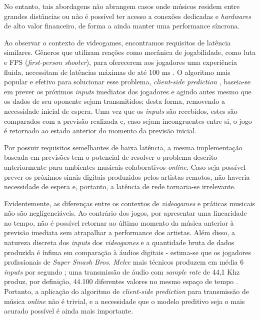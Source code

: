 No entanto, tais abordagens não abrangem casos onde músicos residem entre grandes distâncias ou não é possível ter acesso a conexões dedicadas e \textit{hardwares} de alto valor financeiro, de forma a ainda manter uma performance síncrona.

Ao observar o contexto de videogames, encontramos requisitos de latência similares. Gêneros que utilizam reações como mecânica de jogabilidade, como luta e FPS (\textit{first-person shooter}), para oferecerem aos jogadores uma experiência fluida, necessitam de latências máximas de até 100 ms \cite{pubnub}. O algoritmo mais popular e efetivo para solucionar esse problema, \textit{client-side prediction} \cite{client-side-prediction}, baseia-se em prever os próximos \textit{inputs} imediatos dos jogadores e agindo antes mesmo que os dados de seu oponente sejam transmitidos; desta forma, removendo a necessidade inicial de espera. Uma vez que os \textit{inputs} são recebidos, estes são comparados com a previsão realizada e, caso sejam incongruentes entre si, o jogo é retornado ao estado anterior do momento da previsão inicial.

Por possuir requisitos semelhantes de baixa latência, a mesma implementação baseada em previsões tem o potencial de resolver o problema descrito anteriormente para ambientes musicais colaborativos \textit{online}. Caso seja possível prever os próximos sinais digitais produzidos pelos artistas remotos, não haveria necessidade de espera e, portanto, a latência de rede tornaria-se irrelevante.

Evidentemente, as diferenças entre os contextos de \textit{videogames} e práticas musicais não são negligenciáveis. Ao contrário dos jogos, por apresentar uma linearidade no tempo, não é possível retornar ao último momento da música anterior à previsão imediata sem atrapalhar a performance dos artistas. Além disso, a natureza discreta dos \textit{inputs} dos \textit{videogames} e a quantidade bruta de dados produzida é ínfima em comparação à áudios digitais - estima-se que os jogadores profissionais de \textit{Super Smash Bros. Melee} mais técnicos produzem em média 6 \textit{inputs} por segundo \cite{melee_inputs_per_second}; uma transmissão de áudio com \textit{sample rate} de 44,1 Khz produz, por definição, 44.100 diferentes valores no mesmo espaço de tempo \cite{jukebox_dimension}. Portanto, a aplicação do algoritmo de \textit{client-side prediction} para transmissão de música \textit{online} não é trivial, e a necessidade que o modelo preditivo seja o mais acurado possível é ainda mais importante.

